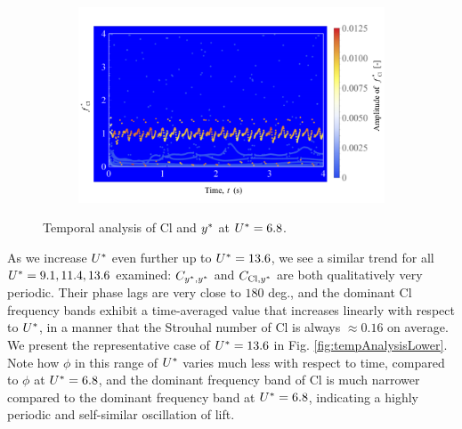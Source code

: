 \documentclass[oneside]{utmthesis}
\begin{document}
\begin{figure} \continuedfloat
  \centering
  \begin{subfigure}[h]{1\textwidth}
    \includegraphics[width=\textwidth]{figs/tempAnalysisUpper-c}
    \caption{}
    \label{fig:tempAnalysisUpper-c}
  \end{subfigure}
  \caption{Temporal analysis of Cl and $y^{*}$ at $U^{*} = 6.8$.} \label{fig:tempAnalysisUpper}
\end{figure}

As we increase $U^{*}$ even further up to $U^{*} = 13.6$, we see a similar trend for all $U^{*} = 9.1, 11.4, 13.6$ examined: $C_{y^{*},y^{*}}$ and $C_{\text{Cl},y^{*}}$ are both qualitatively very periodic. Their phase lags are very close to $180$ deg., and the dominant Cl frequency bands exhibit a time-averaged value that increases linearly with respect to $U^{*}$, in a manner that the Strouhal number of Cl is always $\approx 0.16$ on average. We present the representative case of $U^{*} = 13.6$ in Fig. \ref{fig:tempAnalysisLower}. Note how $\phi$ in this range of $U^{*}$ varies much less with respect to time, compared to $\phi$ at $U^{*} = 6.8$, and the dominant frequency band of Cl is much narrower compared to the dominant frequency band at $U^{*} = 6.8$, indicating a highly periodic and self-similar oscillation of lift.
\end{document}
